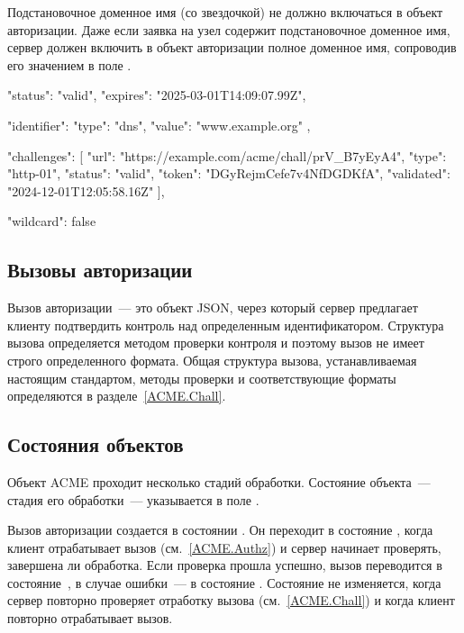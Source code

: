 Подстановочное доменное имя (со звездочкой) не должно включаться в объект 
авторизации. Даже если заявка на узел  содержит подстановочное
доменное имя, сервер должен включить в объект авторизации полное доменное имя,
сопроводив его значением  в поле .

\begin{codeblock}
{
  "status": "valid",
  "expires": "2025-03-01T14:09:07.99Z",

  "identifier": {
    "type": "dns",
    "value": "www.example.org"
  },

  "challenges": [
    {
      "url": "https://example.com/acme/chall/prV_B7yEyA4",
      "type": "http-01",
      "status": "valid",
      "token": "DGyRejmCefe7v4NfDGDKfA",
      "validated": "2024-12-01T12:05:58.16Z"
    }
  ],

  "wildcard": false
}
\end{codeblock}
\fi

\subsection{Вызовы авторизации}\label{ACME.Res.Chall}

Вызов авторизации~--- это объект JSON, через который сервер предлагает 
клиенту подтвердить контроль над определенным идентификатором.
%
Структура вызова определяется методом проверки контроля и поэтому 
вызов не имеет строго определенного формата.
%
Общая структура вызова, устанавливаемая настоящим стандартом, методы проверки 
и соответствующие форматы определяются в разделе~\ref{ACME.Chall}.

\subsection{Состояния объектов}\label{ACME.Res.Status}

Объект ACME проходит несколько стадий обработки. Состояние объекта~--- стадия 
его обработки~--- указывается в поле .

Вызов авторизации создается в состоянии . Он переходит в 
состояние , когда клиент отрабатывает вызов 
(см.~\ref{ACME.Authz}) и сервер начинает проверять, завершена ли обработка.
%
Если проверка прошла успешно, вызов переводится в состояние~, в 
случае ошибки~--- в состояние .
%
Состояние  не изменяется, когда сервер повторно проверяет 
отработку вызова (см.~\ref{ACME.Chall}) и когда клиент повторно отрабатывает 
вызов.

